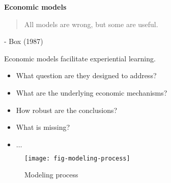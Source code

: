 \begin{frame}\begin{center}
		\LARGE\textbf{Economic models}
\end{center}\end{frame}
\begin{frame}\begin{quote}
All models are wrong, but some are useful.
\end{quote}\vspace{-0.5pt} \hspace{6cm} - Box (1987)
\end{frame}
\begin{frame}
Economic models facilitate experiential learning.\vspace{0.3cm}
\begin{itemize}\setlength\itemsep{1em}
\item What question are they designed to address?
\item What are the underlying economic mechanisms?
\item How robust are the conclusions?
\item What is missing?
\item $\hdots$
\end{itemize}

\end{frame}
\begin{frame}
	\begin{figure}[htp]\centering
		\caption{Modeling process}\scalebox{0.45}
		{\texttt{[image: fig-modeling-process]}}
	\end{figure}
\end{frame}
